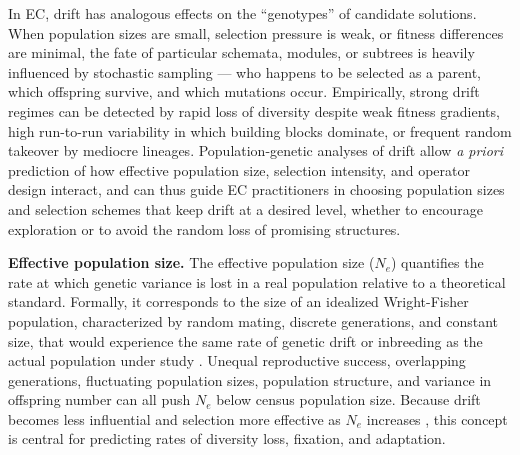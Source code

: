 In EC, drift has analogous effects on the ``genotypes'' of candidate solutions.
When population sizes are small, selection pressure is weak, or fitness differences are minimal, the fate of particular schemata, modules, or subtrees is heavily influenced by stochastic sampling --- who happens to be selected as a parent, which offspring survive, and which mutations occur.
Empirically, strong drift regimes can be detected by rapid loss of diversity despite weak fitness gradients, high run-to-run variability in which building blocks dominate, or frequent random takeover by mediocre lineages.
Population-genetic analyses of drift allow \textit{a priori} prediction of how effective population size, selection intensity, and operator design interact, and can thus guide EC practitioners in choosing population sizes and selection schemes that keep drift at a desired level, whether to encourage exploration or to avoid the random loss of promising structures.

\textbf{Effective population size.}
The effective population size ($N_e$) quantifies the rate at which genetic variance is lost in a real population relative to a theoretical standard.
Formally, it corresponds to the size of an idealized Wright-Fisher population, characterized by random mating, discrete generations, and constant size, that would experience the same rate of genetic drift or inbreeding as the actual population under study \citep{wright1931evolution, hamilton2021population}.
Unequal reproductive success, overlapping generations, fluctuating population sizes, population structure, and variance in offspring number can all push $N_e$ below census population size.
Because drift becomes less influential and selection more effective as $N_e$ increases \citep{crow2017introduction, hamilton2021population}, this concept is central for predicting rates of diversity loss, fixation, and adaptation.

